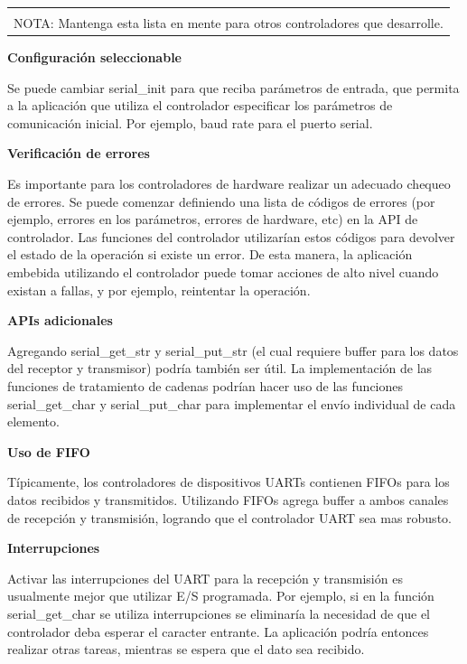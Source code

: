 \documentclass[output=paper, 
colorlinks,
citecolor=brown,
newtxmath
]{langscibook}
\begin{document}
\begin{center}
\begin{tabularx}{\textwidth}{|X|}
\hline
\rowcolor{aliceblue}
\textbf{}\\
NOTA: Mantenga esta lista en mente para otros controladores que desarrolle.\\
\hline
\end{tabularx}
\end{center}



\textbf{Configuración seleccionable}

Se puede cambiar serial\_init para que reciba parámetros de entrada,
que permita a la aplicación que utiliza el controlador especificar
los parámetros de comunicación inicial. Por ejemplo, baud rate para
el puerto serial.

\textbf{Verificación de errores}

Es importante para los controladores de hardware realizar un adecuado
chequeo de errores. Se puede comenzar definiendo una lista de códigos
de errores (por ejemplo, errores en los parámetros, errores de hardware, etc)
en la API de controlador.
Las funciones del controlador utilizarían estos códigos para devolver
el estado de la operación si existe un error. De esta manera, la aplicación embebida
utilizando el controlador puede tomar acciones de alto nivel cuando existan
a fallas, y por ejemplo, reintentar la operación.

\textbf{APIs adicionales}

Agregando serial\_get\_str y serial\_put\_str (el cual requiere buffer para
los datos del receptor y transmisor) podría también ser útil. La implementación
de las funciones de tratamiento de cadenas podrían hacer uso de las funciones
serial\_get\_char y serial\_put\_char para implementar el envío individual
de cada elemento.

\textbf{Uso de FIFO}

Típicamente, los controladores de dispositivos UARTs contienen FIFOs para los datos recibidos y transmitidos.
Utilizando FIFOs agrega buffer a ambos canales de recepción y transmisión,
logrando que el controlador UART  sea mas robusto.

\textbf{Interrupciones}

Activar las interrupciones del UART para la recepción y transmisión es
usualmente mejor que utilizar E/S programada. Por ejemplo, si en la función
serial\_get\_char se utiliza interrupciones se eliminaría la necesidad
de que el controlador deba esperar el caracter entrante. 
La aplicación podría entonces realizar
otras tareas, mientras se espera que el dato sea recibido. 
\end{document}

